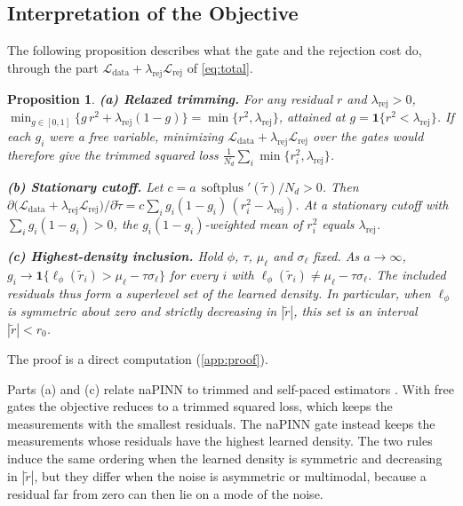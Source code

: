 \documentclass[twoside]{article}
\newtheorem{proposition}{Proposition}
\newcommand{\rej}{\lambda_{\mathrm{rej}}}
\DeclareMathOperator{\softplus}{softplus}
\begin{document}
\subsection{Interpretation of the Objective}
\label{sec:properties}

The following proposition describes what the gate and the rejection cost do,
through the part $\mathcal{L}_{\mathrm{data}} + \rej\mathcal{L}_{\mathrm{rej}}$
of \cref{eq:total}.

\begin{proposition}
\label{prop:gate}
\textbf{(a) Relaxed trimming.} For any residual $r$ and $\rej > 0$,
$\min_{g \in [0,1]} \{ g\, r^2 + \rej (1-g) \} = \min\{r^2, \rej\}$, attained at
$g = \mathbf{1}\{r^2 < \rej\}$. If each $g_i$ were a free variable, minimizing
$\mathcal{L}_{\mathrm{data}} + \rej\mathcal{L}_{\mathrm{rej}}$ over the gates
would therefore give the trimmed squared loss
$\frac{1}{N_d}\sum_i \min\{r_i^2, \rej\}$.

\textbf{(b) Stationary cutoff.} Let $c = a\,\softplus'(\tilde\tau)/N_d > 0$. Then
$\partial \big(\mathcal{L}_{\mathrm{data}} + \rej\mathcal{L}_{\mathrm{rej}}\big) /
\partial \tilde\tau = c \sum_i g_i(1-g_i)\,(r_i^2 - \rej)$. At a stationary
cutoff with $\sum_i g_i(1-g_i) > 0$, the $g_i(1-g_i)$-weighted mean of $r_i^2$
equals $\rej$.

\textbf{(c) Highest-density inclusion.} Hold $\phi$, $\tau$, $\mu_\ell$ and
$\sigma_\ell$ fixed. As $a \to \infty$,
$g_i \to \mathbf{1}\{\ell_\phi(\tilde r_i) > \mu_\ell - \tau\sigma_\ell\}$ for every
$i$ with $\ell_\phi(\tilde r_i) \neq \mu_\ell - \tau\sigma_\ell$. The included
residuals thus form a superlevel set of the learned density. In particular,
when $\ell_\phi$ is symmetric about zero and strictly decreasing in $|\tilde r|$,
this set is an interval $|\tilde r| < r_0$.
\end{proposition}

\noindent The proof is a direct computation (\cref{app:proof}).

Parts (a) and (c) relate naPINN to trimmed and self-paced estimators
\citep{Rousseeuw1984, Kumar2010}. With free gates the objective reduces to a
trimmed squared loss, which keeps the measurements with the smallest residuals.
The naPINN gate instead keeps the measurements whose residuals have the highest
learned density. The two rules induce the same ordering when the learned
density is symmetric and decreasing in $|\tilde r|$, but they differ when the
noise is asymmetric or multimodal, because a residual far from zero can then lie
on a mode of the noise.
\end{document}
